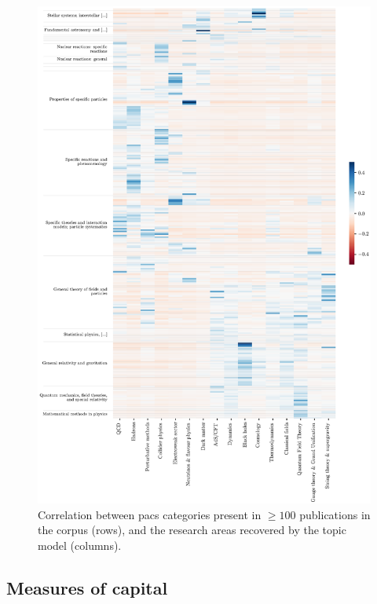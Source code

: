 \documentclass{article}
\begin{document}
\begin{figure}[H]
    \centering
    \includegraphics[height=0.73\paperheight
]{plots/pacs_clustermap.eps}
    \caption{Correlation between \gls{pacs} categories present in $\geq 100$ publications in the corpus (rows), and the research areas recovered by the topic model (columns).}
\end{figure}


\subsection{\label{appendix:capital_validation}Measures of capital}
\end{document}
